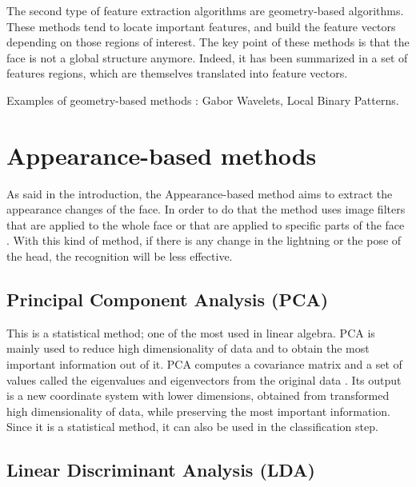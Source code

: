 \noindent The second type of feature extraction algorithms are geometry-based algorithms. These methods tend to locate important features, and build the feature vectors depending on those regions of interest. The key point of these methods is that the face is not a global structure anymore. Indeed, it has been summarized in a set of features regions, which are themselves translated into feature vectors.
\vspace{\baselineskip}

\noindent Examples of geometry-based methods : Gabor Wavelets, Local Binary Patterns.
\newline

\section{Appearance-based methods}

\noindent As said in the introduction, the Appearance-based method aims to extract the appearance changes of the face. In order to do that the method uses image filters that are applied to the whole face or that are applied to specific parts of the face \cite{SHA09}. With this kind of method, if there is any change in the lightning or the pose of the head, the recognition will be less effective.
\newline

\subsection{Principal Component Analysis (PCA)}

\vspace{\baselineskip}
\noindent This is a statistical method; one of the most used in linear algebra. PCA is mainly used to reduce high dimensionality of data and to obtain the most important information out of it. PCA computes a covariance matrix and a set of values called the eigenvalues and eigenvectors from the original data \cite{GAN08}. Its output is a new coordinate system with lower dimensions, obtained from transformed high dimensionality of data, while preserving the most important information.  Since it is a statistical method, it can also be used in the classification step.
\newline

\subsection{Linear Discriminant Analysis (LDA)}

